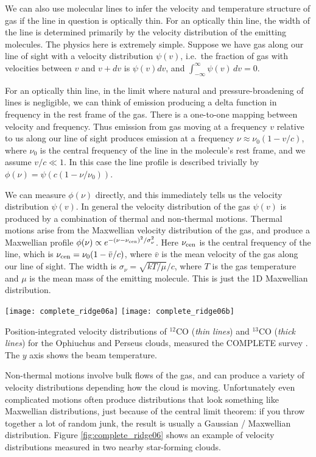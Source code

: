 We can also use molecular lines to infer the velocity and temperature structure of gas if the line in question is optically thin. For an optically thin line, the width of the line is determined primarily by the velocity distribution of the emitting molecules. The physics here is extremely simple. Suppose we have gas along our line of sight with a velocity distribution $\psi(v)$, i.e.\ the fraction of gas with velocities between $v$ and $v+dv$ is $\psi(v) dv$, and $\int_{-\infty}^{\infty} \psi(v) \, dv = 0$.

For an optically thin line, in the limit where natural and pressure-broadening of lines is negligible, we can think of emission producing a delta function in frequency in the rest frame of the gas. There is a one-to-one mapping between velocity and frequency. Thus emission from gas moving at a frequency $v$ relative to us along our line of sight produces emission at a frequency $\nu \approx \nu_0 (1 - v/c)$, where $\nu_0$ is the central frequency of the line in the molecule's rest frame, and we assume $v/c \ll 1$. In this case the line profile is described trivially by $\phi(\nu)=\psi(c(1-\nu/\nu_0))$. 

We can measure $\phi(\nu)$ directly, and this immediately tells us the velocity distribution $\psi(v)$. In general the velocity distribution of the gas $\psi(v)$ is produced by a combination of thermal and non-thermal motions. Thermal motions arise from the Maxwellian velocity distribution of the gas, and produce a Maxwellian profile $\phi(\nu)\propto e^{-(\nu-\nu_{\rm cen})^2/\sigma_\nu^2}$. Here $\nu_{\rm cen}$ is the central frequency of the line, which is $\nu_{\rm cen} = \nu_0 (1 - \bar{v}/c)$, where $\bar{v}$ is the mean velocity of the gas along our line of sight. The width is $\sigma_\nu = \sqrt{kT/\mu}/c$, where $T$ is the gas temperature and $\mu$ is the mean mass of the emitting molecule. This is just the 1D Maxwellian distribution.

\begin{marginfigure}
\texttt{[image: complete\_ridge06a]}
\texttt{[image: complete\_ridge06b]}
\caption[COMPLETE spectra of Ophiuchus and Perseus]{
\label{fig:complete_ridge06}
Position-integrated velocity distributions of $^{12}$CO (\textit{thin lines}) and $^{13}$CO (\textit{thick lines}) for the Ophiuchus and Perseus clouds, measured the COMPLETE survey \citep{ridge06a}. The $y$ axis shows the beam temperature.
}
\end{marginfigure}

Non-thermal motions involve bulk flows of the gas, and can produce a variety of velocity distributions depending how the cloud is moving. Unfortunately even complicated motions often produce distributions that look something like Maxwellian distributions, just because of the central limit theorem: if you throw together a lot of random junk, the result is usually a Gaussian / Maxwellian distribution. Figure \ref{fig:complete_ridge06} shows an example of velocity distributions measured in two nearby star-forming clouds.

